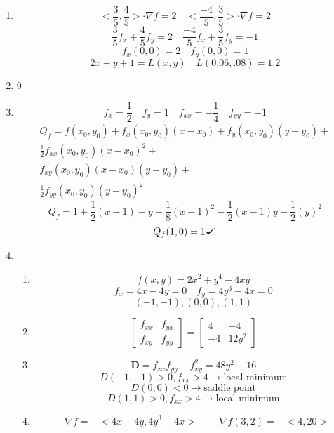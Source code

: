 \documentclass[12pt]{article}
\def\checkmark{\tikz\fill[scale=0.4](0,.35) -- (.25,0) -- (1,.7) -- (.25,.15) -- cycle;}
\begin{document}
\begin{enumerate}
\item $$<\frac{3}{5}, \frac{4}{5}> \cdot \nabla f = 2 \quad <\frac{-4}{5}, \frac{3}{5}> \cdot \nabla f = 2$$
$$\frac{3}{5}f_x+\frac{4}{5}f_y=2 \quad \frac{-4}{5}f_x+\frac{3}{5}f_y=-1$$
$$f_x (0,0) = 2 \quad f_y(0,0)=1$$
$$2x+y+1=L(x,y) \quad L(0.06, .08) = 1.2$$
\item 9
\item 
$$f_x = \frac{1}{2} \quad f_y = 1 \quad f_{xx} = -\frac{1}{4} \quad f_{yy}=-1$$
\begin{align*}
Q_f=f(x_0,y_0)+f_x(x_0,y_0)(x-x_0)+f_y(x_0,y_0)(y-y_0)+ \\
\frac{1}{2}f_{xx}(x_0,y_0)(x-x_0)^2+ \\
f_{xy}(x_0,y_0)(x-x_0)(y-y_0)+ \\
\frac{1}{2}f_{yy}(x_0,y_0)(y-y_0)^2
\end{align*}
$$Q_f = 1+\frac{1}{2}(x-1)+y-\frac{1}{8}(x-1)^2-\frac{1}{2}(x-1)y-\frac{1}{2}(y)^2$$
$$Q_f(1,0) = 1 \checkmark$$
\item \begin{enumerate}
\item $$f(x,y) = 2x^2+y^4-4xy$$
$$f_x = 4x-4y = 0 \quad f_y = 4y^3-4x=0$$
$$(-1,-1), (0,0), (1,1)$$
\item 
$$
\begin{bmatrix}
   f_{xx} & f_{yx} \\
   f_{xy} & f_{yy}
\end{bmatrix}
=
\begin{bmatrix}
   4 & -4 \\
   -4 & 12y^2
\end{bmatrix}$$
\item $$\textbf{D} = f_{xx}f_{yy} - f_{xy}^2 = 48y^2-16$$
$$D(-1,-1) > 0, f_{xx} > 4 \rightarrow \textrm{local minimum}$$
$$D(0,0) < 0 \rightarrow \textrm{saddle point}$$
$$D(1,1) > 0, f_{xx} > 4 \rightarrow \textrm{local minimum}$$
\item $$-\nabla f = -<4x-4y, 4y^3-4x> \quad -\nabla f(3,2) = -<4, 20>$$
\end{enumerate}
\end{enumerate} 
\end{document}

